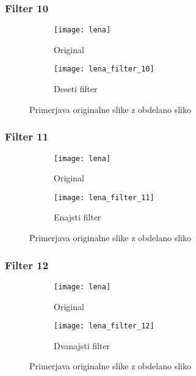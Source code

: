 \subsubsection*{Filter 10}
\begin{figure}[h]
    \centering
    \begin{subfigure}[b]{0.4\textwidth}
        \texttt{[image: lena]}
        \caption{Original}
    \end{subfigure}
    \begin{subfigure}[b]{0.4\textwidth}
        \texttt{[image: lena\_filter\_10]}
        \caption{Deseti filter}
    \end{subfigure}
    \caption{Primerjava originalne slike z obdelano sliko}
    \label{fig:lena_filter_10}
\end{figure}


\subsubsection*{Filter 11}
\begin{figure}[h]
    \centering
    \begin{subfigure}[b]{0.4\textwidth}
        \texttt{[image: lena]}
        \caption{Original}
    \end{subfigure}
    \begin{subfigure}[b]{0.4\textwidth}
        \texttt{[image: lena\_filter\_11]}
        \caption{Enajsti filter}
    \end{subfigure}
    \caption{Primerjava originalne slike z obdelano sliko}
    \label{fig:lena_filter_11}
\end{figure}


\subsubsection*{Filter 12}
\begin{figure}[h]
    \centering
    \begin{subfigure}[b]{0.4\textwidth}
        \texttt{[image: lena]}
        \caption{Original}
    \end{subfigure}
    \begin{subfigure}[b]{0.4\textwidth}
        \texttt{[image: lena\_filter\_12]}
        \caption{Dvanajsti filter}
    \end{subfigure}
    \caption{Primerjava originalne slike z obdelano sliko}
    \label{fig:lena_filter_12}
\end{figure}


